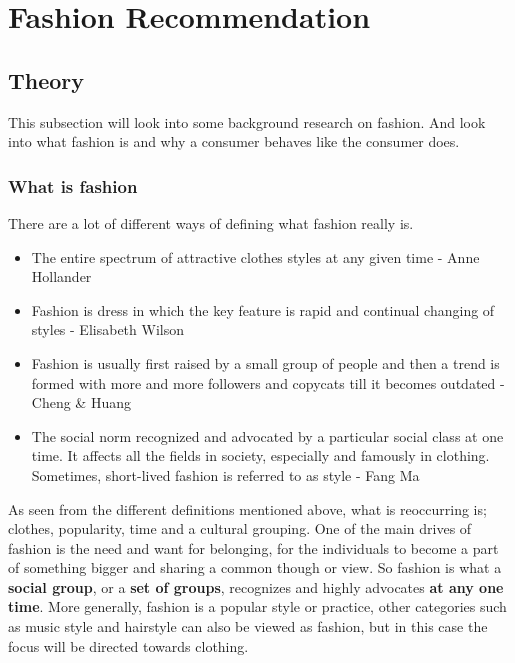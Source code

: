 
\section{Fashion Recommendation}



\subsection{Theory}
  \label{subsec:theory}
  This subsection will look into some background research on fashion.  And look
  into what fashion is and why a consumer behaves like the consumer does.

\subsubsection{What is fashion}
  There are a lot of different ways of defining what fashion really is.

  \begin{itemize}
      \item The entire spectrum of attractive clothes styles at any given time -
      Anne Hollander
      \item Fashion is dress in which the key feature is rapid and continual
      changing of styles - Elisabeth Wilson
      \item Fashion is usually first raised by a small group of people and then a
      trend is formed with more and more followers and copycats till it becomes
      outdated - Cheng \& Huang
      \item The social norm recognized and advocated by a particular social class
      at one time. It affects all the fields in society, especially and famously
      in clothing. Sometimes, short-lived fashion is referred to as style - Fang
      Ma \cite{Fang2012}
  \end{itemize}

  As seen from the different definitions mentioned above, what is reoccurring is;
  clothes, popularity, time and a cultural grouping.
  One of the main drives of fashion is the need and want for belonging, for the individuals to become a part of something bigger and sharing a common though or view.
  So fashion is what a \textbf{social group}, or a \textbf{set of groups}, recognizes and highly advocates \textbf{at any one time}.
  More generally, fashion is a popular style or practice, other categories such as music style and hairstyle can also be viewed as fashion, but in this case the focus will be directed towards clothing.

